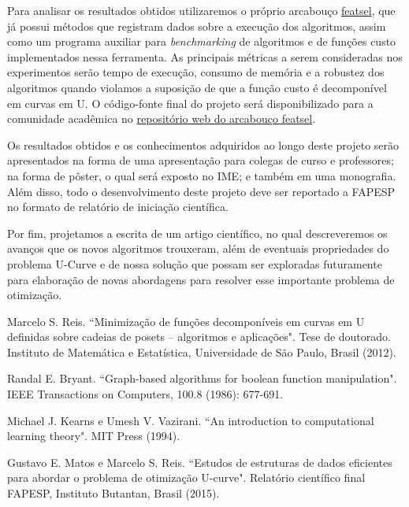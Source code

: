 \documentclass[12pt]{article}
\begin{document}
Para analisar os resultados obtidos utilizaremos o próprio arcabouço
\href{https://github.com/msreis/featsel}{featsel}, que já possui métodos
que registram dados sobre a execução dos algoritmos, assim como um
programa auxiliar para {\em benchmarking} de algoritmos e de funções
custo implementados nessa ferramenta. As principais métricas a serem 
consideradas nos experimentos serão tempo de execução, consumo de 
memória e a robustez dos algoritmos quando violamos a suposição de que 
a função custo é decomponível em curvas em U. O código-fonte final do 
projeto será disponibilizado para a comunidade acadêmica no 
\href{https://github.com/msreis/featsel}{repositório web do arcabouço
featsel}.

Os resultados obtidos e os conhecimentos adquiridos ao longo deste
projeto serão apresentados na forma de uma apresentação para colegas de
curso e professores; na forma de pôster, o qual será exposto no IME;
e também em uma monografia. Além disso, todo o desenvolvimento deste 
projeto deve ser reportado a FAPESP no formato de relatório de iniciação
científica.

Por fim, projetamos a escrita de um artigo científico, no qual 
descreveremos os avanços que os novos algoritmos trouxeram, além de
eventuais propriedades do problema U-Curve e de nossa solução que possam
ser exploradas futuramente para elaboração de novas abordagens para 
resolver esse importante problema de otimização.


\begin{thebibliography}{}
    Marcelo S. Reis. ``Minimização de funções decomponíveis em curvas em U definidas sobre cadeias de posets -- algoritmos e aplicações".
    Tese de doutorado. Instituto de Matemática e Estatística, Universidade de São Paulo, Brasil (2012).

Randal E. Bryant. ``Graph-based algorithms for boolean function manipulation". IEEE Transactions on Computers, 100.8 (1986): 677-691. 

Michael J. Kearns e Umesh V. Vazirani. ``An introduction to computational learning theory". MIT Press (1994).

Gustavo E. Matos e Marcelo S. Reis. ``Estudos de estruturas de dados eficientes para abordar o problema de otimização U-curve". Relatório científico final FAPESP, Instituto Butantan, Brasil (2015).

\end{thebibliography}
\end{document}
